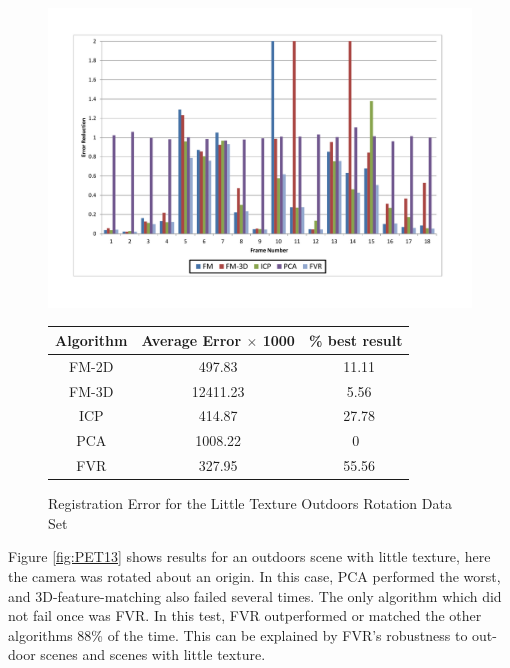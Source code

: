 \begin{figure}
\centering
\includegraphics[width=6in]{images/results/Outside_No_Texture_Rotation}
\caption{Registration Error for the Little Texture Outdoors Rotation Data Set}
\label{fig:PET13}

\begin{tabular}{ccc}
\hline
\textbf{Algorithm} & \textbf{Average Error $\times$ 1000} & \textbf{\% best result}\\ \hline
FM-2D	& 497.83 & ~11.11\\
FM-3D	& 12411.23 & ~5.56\\
ICP		& 414.87 & ~27.78\\
PCA		& 1008.22 & 0\\
FVR		& 327.95 & ~55.56\\
\end{tabular}
\label{tab:PET13ST}
\end{figure} 


Figure \ref{fig:PET13} shows results for an outdoors scene with little texture, here the camera was rotated about an origin. In this case, PCA performed the worst, and 3D-feature-matching also failed several times. The only algorithm which did not fail once was FVR. In this test, FVR outperformed or matched the other algorithms 88\% of the time. This can be explained by FVR's robustness to out-door scenes and scenes with little texture.  \\

